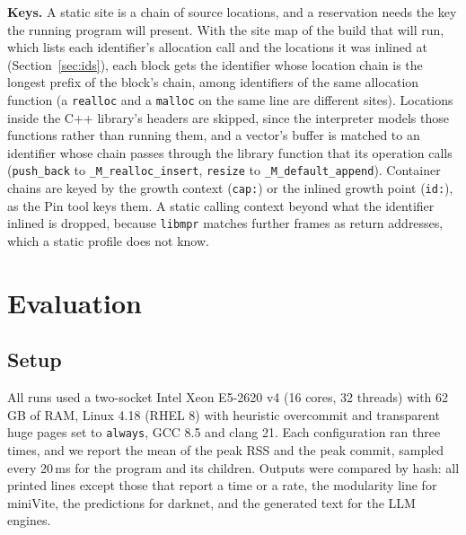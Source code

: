 \documentclass[11pt]{article}
\newcommand{\libmpr}{\texttt{libmpr}}
\newcommand{\secref}[1]{Section~\ref{#1}}
\begin{document}
\textbf{Keys.} A static site is a chain of source locations, and a reservation needs the key the running program
will present. With the site map of the build that will run, which lists each identifier's allocation call and
the locations it was inlined at (\secref{sec:ids}), each block gets the identifier whose location chain is the
longest prefix of the block's chain, among identifiers of the same allocation function (a \texttt{realloc} and a
\texttt{malloc} on the same line are different sites). Locations inside the C++ library's headers are skipped,
since the interpreter models those functions rather than running them, and a vector's buffer is matched to an
identifier whose chain passes through the library function that its operation calls (\texttt{push\_back} to
\texttt{\_M\_realloc\_insert}, \texttt{resize} to \texttt{\_M\_default\_append}). Container chains are keyed by the
growth context (\texttt{cap:}) or the inlined growth point (\texttt{id:}), as the Pin tool keys them. A static
calling context beyond what the identifier inlined is dropped, because \libmpr{} matches further frames as
return addresses, which a static profile does not know.

\section{Evaluation}
\label{sec:eval}

\subsection{Setup}

All runs used a two-socket Intel Xeon E5-2620 v4 (16 cores, 32 threads) with 62\,GB of RAM, Linux 4.18 (RHEL 8)
with heuristic overcommit and transparent huge pages set to \texttt{always}, GCC 8.5 and clang 21. Each
configuration ran three times, and we report the mean of the peak RSS and the peak commit, sampled every 20\,ms
for the program and its children. Outputs were compared by hash: all printed lines except those that report a
time or a rate, the modularity line for miniVite, the predictions for darknet, and the generated text for the LLM
engines.
\end{document}
